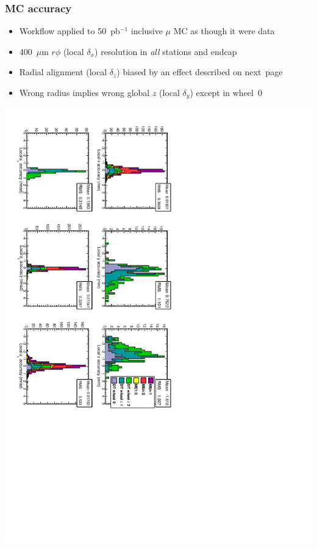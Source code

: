 \documentclass[compress]{beamer}
\begin{document}
\begin{frame}
\frametitle{MC accuracy}

\begin{itemize}
\item Workflow applied to 50~pb$^{-1}$ inclusive $\mu$ MC as though it were data
\item 400~$\mu$m $r\phi$ (local $\delta_x$) resolution in {\it all} stations and endcap
\item Radial alignment (local $\delta_z$) biased by an effect described on \mbox{next page\hspace{-1 cm}}
\item Wrong radius implies wrong global $z$ (local $\delta_y$) except in wheel~0
\end{itemize}

\includegraphics[height=\linewidth, angle=90]{mc_accuracy.pdf}
\end{frame}
\end{document}
